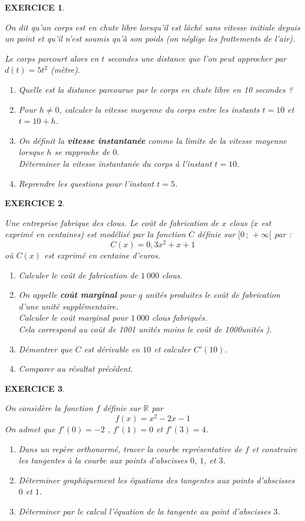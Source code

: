 \documentclass[a4paper]{article}   %
\renewcommand{\(}{\left(}
\renewcommand{\)}{\right)}
\newtheorem{EXO}{\large EXERCICE }
\newenvironment{EX}   { \setcounter{ques}{0} \begin{EXO} \hrulefill ~\vspace{0.3cm}

\normalfont}    {\end{EXO} \medskip}
\begin{document}
\begin{center} 	
\end{center}

\begin{EX}
On dit qu'un corps est en chute libre lorsqu'il est lâché sans vitesse initiale depuis un point et qu'il n'est soumis qu'à son poids (on néglige les frottements de l'air). 

Le corps parcourt alors en $t$ secondes une distance que l'on peut approcher par $d(t)=5t^2$ (mètre).
\begin{enumerate}
\item Quelle est la distance parcourue par le corps en chute libre en 10 secondes ?
\item Pour $h \ne 0$, calculer la vitesse moyenne du corps entre les instants $t=10$ et $t=10+h$. 
\item On définit la \textbf{vitesse instantanée} comme la limite de la vitesse moyenne lorsque $h$ se rapproche de $0$.\\ Déterminer la vitesse instantanée du corps à l'instant $t=10$. 
\item Reprendre les questions pour l'instant $t=5$. 
\end{enumerate} 
\end{EX}

\begin{EX}
Une entreprise fabrique des clous. Le coût de fabrication de $x$ clous ($x$ est exprimé en centaines) est modélisé par la fonction $C$ définie sur $[0\,;\,+\infty[$ par :
$$C(x)=0,3x^2+x+1$$
où $C(x)$ est exprimé en centaine d'euros.
\begin{enumerate}
\item Calculer le coût de fabrication de $1~000$ clous. 
\item On appelle \textbf{coût marginal} pour $q$ unités produites le coût de fabrication d'une unité supplémentaire.\\ Calculer le coût marginal pour $1~000$ clous fabriqués. \\ {\emph{Cela correspond au coût de 1001 unités moins le coût de 1000unités ).}}
\item Démontrer que $C$ est dérivable en $10$ et calculer $C'(10)$.
\item Comparer au résultat précédent.
\end{enumerate}
\end{EX}

\begin{EX} On considère la fonction $f$ définie sur $\mathbb{R}$ par $$f(x)=x^2-2x-1$$
On admet que $f'(0)=-2$ , $f'(1)=0$ et $f'(3)=4$.
\begin{enumerate}
\item Dans un repère orthonormé, tracer la courbe représentative de $f$ et construire les tangentes à la courbe aux points d'abscisses $0$, $1$, et $3$.
\item Déterminer graphiquement les équations des tangentes aux points d'abscisses $0$ et $1$. 
\item Déterminer par le calcul l'équation de la tangente au point d'abscisses $3$.
\end{enumerate}
\end{EX}
\end{document}
